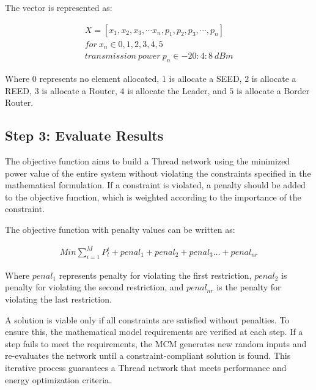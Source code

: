 The vector is represented as:

\begin{equation}\label{eq:vector_x}
    \begin{split}
        X=\left[x_1,x_2,x_3,\cdots x_n,p_1,p_2,p_3,\cdots,p_n\right] \\
        for{\ x}_n\in0,1,2,3,4,5 \\
        transmission\ power\ p_n\in-20:4:8\ dBm
    \end{split}
\end{equation}

    Where $0$ represents no element allocated, $1$ is allocate a SEED, $2$ is allocate a REED, $3$ is allocate a Router, $4$ is allocate the Leader, and $5$ is allocate a Border Router.
\vspace{2mm}

\subsection{Step 3: Evaluate Results}\label{sec:monte_carlo_method_step_3}
The objective function aims to build a Thread network using the minimized power value of the entire system without violating the constraints specified in the mathematical formulation. If a constraint is violated, a penalty should be added to the objective function, which is weighted according to the importance of the constraint.

The objective function with penalty values can be written as:

\begin{equation}\label{eq:objective_function}
    \begin{aligned}
        Min\sum_{i=1}^{M}P_t^i+penal_1+penal_2+penal_3\ldots+penal_{nr}
    \end{aligned}
\end{equation}

    Where $penal_1$ represents penalty for violating the first restriction, $penal_2$ is penalty for violating the second restriction, and $penal_{nr}$ is the penalty for violating the last restriction.
\vspace{2mm}

A solution is viable only if all constraints are satisfied without penalties. To ensure this, the mathematical model requirements are verified at each step. If a step fails to meet the requirements, the MCM generates new random inputs and re-evaluates the network until a constraint-compliant solution is found. This iterative process guarantees a Thread network that meets performance and energy optimization criteria.

